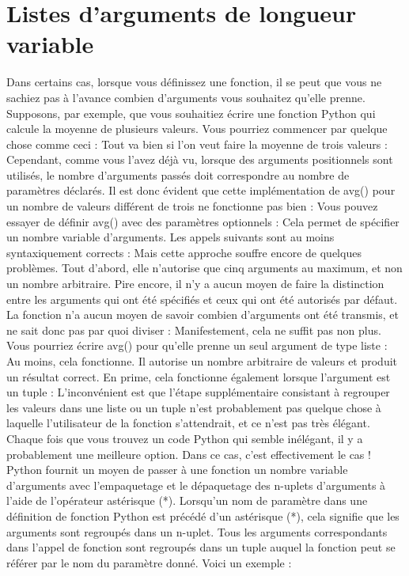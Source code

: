 \section{Listes d'arguments de longueur variable}
Dans certains cas, lorsque vous définissez une fonction, il se peut que vous ne sachiez pas à l'avance combien d'arguments vous souhaitez qu'elle prenne.  Supposons, par exemple, que vous souhaitiez écrire une fonction Python qui calcule la moyenne de plusieurs valeurs.  Vous pourriez commencer par quelque chose comme ceci :
Tout va bien si l'on veut faire la moyenne de trois valeurs :
Cependant, comme vous l'avez déjà vu, lorsque des arguments positionnels sont utilisés, le nombre d'arguments passés doit correspondre au nombre de paramètres déclarés.  Il est donc évident que cette implémentation de avg() pour un nombre de valeurs différent de trois ne fonctionne pas bien :
Vous pouvez essayer de définir avg() avec des paramètres optionnels :
Cela permet de spécifier un nombre variable d'arguments.  Les appels suivants sont au moins syntaxiquement corrects :
Mais cette approche souffre encore de quelques problèmes. Tout d'abord, elle n'autorise que cinq arguments au maximum, et non un nombre arbitraire. Pire encore, il n'y a aucun moyen de faire la distinction entre les arguments qui ont été spécifiés et ceux qui ont été autorisés par défaut.  La fonction n'a aucun moyen de savoir combien d'arguments ont été transmis, et ne sait donc pas par quoi diviser :
Manifestement, cela ne suffit pas non plus.
Vous pourriez écrire avg() pour qu'elle prenne un seul argument de type liste :
Au moins, cela fonctionne.  Il autorise un nombre arbitraire de valeurs et produit un résultat correct.  En prime, cela fonctionne également lorsque l'argument est un tuple :
L'inconvénient est que l'étape supplémentaire consistant à regrouper les valeurs dans une liste ou un tuple n'est probablement pas quelque chose à laquelle l'utilisateur de la fonction s'attendrait, et ce n'est pas très élégant.  Chaque fois que vous trouvez un code Python qui semble inélégant, il y a probablement une meilleure option.
Dans ce cas, c'est effectivement le cas !  Python fournit un moyen de passer à une fonction un nombre variable d'arguments avec l'empaquetage et le dépaquetage des n-uplets d'arguments à l'aide de l'opérateur astérisque (*).
Lorsqu'un nom de paramètre dans une définition de fonction Python est précédé d'un astérisque (*), cela signifie que les arguments sont regroupés dans un n-uplet.  Tous les arguments correspondants dans l'appel de fonction sont regroupés dans un tuple auquel la fonction peut se référer par le nom du paramètre donné. Voici un exemple :

